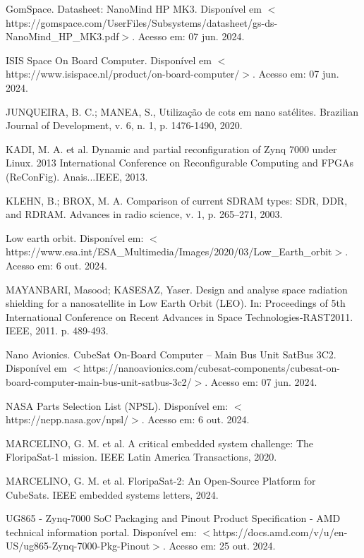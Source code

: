 \begin{flushleft}
\begin{thebibliography}{00}
 GomSpace. Datasheet: NanoMind HP MK3. Disponível em $<$https://gomspace.com/UserFiles/Subsystems/datasheet/gs-ds-NanoMind\_HP\_MK3.pdf$>$. Acesso em: 07 jun. 2024.

 ISIS Space On Board Computer. Disponível em $<$https://www.isispace.nl/product/on-board-computer/$>$. Acesso em: 07 jun. 2024.

 JUNQUEIRA, B. C.; MANEA, S., Utilização de cots em nano satélites. Brazilian Journal of Development, v. 6, n. 1, p. 1476-1490, 2020.

 KADI, M. A. et al. Dynamic and partial reconfiguration of Zynq 7000 under Linux. 2013 International Conference on Reconfigurable Computing and FPGAs (ReConFig). Anais...IEEE, 2013.

 KLEHN, B.; BROX, M. A. Comparison of current SDRAM types: SDR, DDR, and RDRAM. Advances in radio science, v. 1, p. 265–271, 2003.

 Low earth orbit. Disponível em: $<$https://www.esa.int/ESA\_Multimedia/Images/2020/03/Low\_Earth\_orbit$>$. Acesso em: 6 out. 2024.

 MAYANBARI, Masood; KASESAZ, Yaser. Design and analyse space radiation shielding for a nanosatellite in Low Earth Orbit (LEO). In: Proceedings of 5th International Conference on Recent Advances in Space Technologies-RAST2011. IEEE, 2011. p. 489-493.

 Nano Avionics. CubeSat On-Board Computer – Main Bus Unit SatBus 3C2. Disponível em $<$https://nanoavionics.com/cubesat-components/cubesat-on-board-computer-main-bus-unit-satbus-3c2/$>$. Acesso em: 07 jun. 2024.

 NASA Parts Selection List (NPSL). Disponível em: $<$https://nepp.nasa.gov/npsl/$>$. Acesso em: 6 out. 2024.

 MARCELINO, G. M. et al. A critical embedded system challenge: The FloripaSat-1 mission. IEEE Latin America Transactions, 2020.

 MARCELINO, G. M. et al. FloripaSat-2: An Open-Source Platform for CubeSats. IEEE embedded systems letters, 2024.

 UG865 - Zynq-7000 SoC Packaging and Pinout Product Specification - AMD technical information portal. Disponível em: $<$https://docs.amd.com/v/u/en-US/ug865-Zynq-7000-Pkg-Pinout$>$. Acesso em: 25 out. 2024.




\end{thebibliography}
\end{flushleft}

